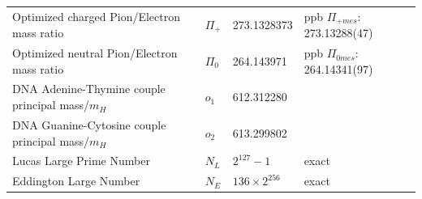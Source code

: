 \documentclass[a4paper,9pt]{article}
\begin{document}
\begin{table}
\begin{tabular}{llll}
  
  
  Optimized  charged Pion/Electron mass ratio  & $\Pi_+$ & 273.1328373  & ppb\cite{Sanchez2} $\Pi_{+mes}$: 273.13288(47)  \\     
  Optimized  neutral Pion/Electron mass ratio  & $\Pi_0$ & 264.143971  & ppb\cite{Sanchez2} $\Pi_{0mes}$: 264.14341(97)\\ 
  
  
  
 DNA Adenine-Thymine couple principal mass/$m_H$ &  $o_1$   & 612.312280 & \cite{Huang} \\
 DNA Guanine-Cytosine couple principal mass/$m_H$ &  $o_2$   & 613.299802 & \cite{Huang} \\ 
  
  
   
  
   
  
                         
    Lucas Large Prime Number & $N_L$    & $2^{127}-1$  & exact \\
    Eddington Large Number & $N_{E}$    & $136\times 2^{256}$  & exact \\
          

\end{tabular}
\end{table}
\end{document}
